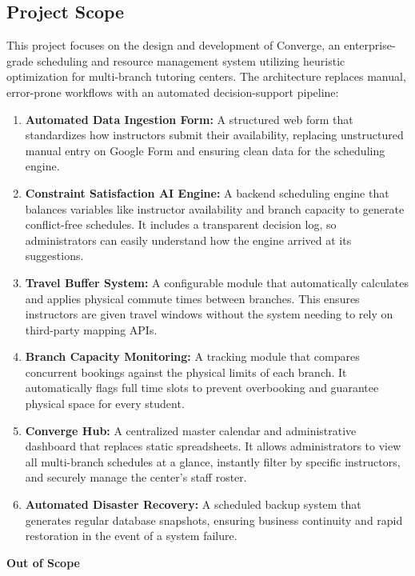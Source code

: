 \subsection{Project Scope}
This project focuses on the design and development of Converge, an enterprise-grade scheduling and resource management system utilizing heuristic optimization for multi-branch tutoring centers. The architecture replaces manual, error-prone workflows with an automated decision-support pipeline:
\begin{enumerate}
    \item \textbf{Automated Data Ingestion Form:} A structured web form that standardizes how instructors submit their availability, replacing unstructured manual entry on Google Form and ensuring clean data for the scheduling engine.
    \item \textbf{Constraint Satisfaction AI Engine:} A backend scheduling engine that balances variables like instructor availability and branch capacity to generate conflict-free schedules. It includes a transparent decision log, so administrators can easily understand how the engine arrived at its suggestions.
    \item \textbf{Travel Buffer System:} A configurable module that automatically calculates and applies physical commute times between branches. This ensures instructors are given travel windows without the system needing to rely on third-party mapping APIs.
    \item \textbf{Branch Capacity Monitoring:} A tracking module that compares concurrent bookings against the physical limits of each branch. It automatically flags full time slots to prevent overbooking and guarantee physical space for every student.
    \item \textbf{Converge Hub:} A centralized master calendar and administrative dashboard that replaces static spreadsheets. It allows administrators to view all multi-branch schedules at a glance, instantly filter by specific instructors, and securely manage the center's staff roster.
    \item \textbf{Automated Disaster Recovery:} A scheduled backup system that generates regular database snapshots, ensuring business continuity and rapid restoration in the event of a system failure.
\end{enumerate}
\textbf{Out of Scope}

